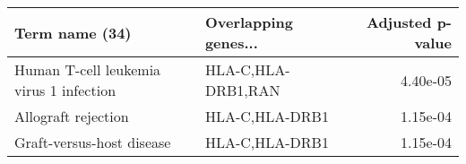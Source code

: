 \begin{tabular}{llr}
\toprule
                         Term name (34) & Overlapping genes... &  Adjusted p-value \\
\midrule
Human T-cell leukemia virus 1 infection &   HLA-C,HLA-DRB1,RAN &          4.40e-05 \\
                    Allograft rejection &       HLA-C,HLA-DRB1 &          1.15e-04 \\
              Graft-versus-host disease &       HLA-C,HLA-DRB1 &          1.15e-04 \\
\bottomrule
\end{tabular}
